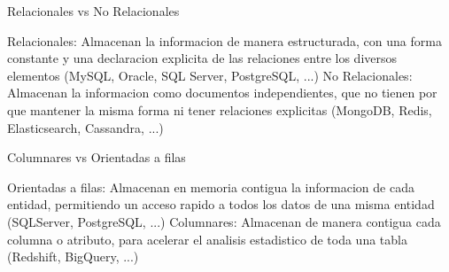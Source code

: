 
Relacionales vs No Relacionales


Relacionales: Almacenan la informacion de manera estructurada, con una forma constante y una declaracion explicita de las relaciones entre los diversos elementos (MySQL, Oracle, SQL Server, PostgreSQL, ...)
No Relacionales: Almacenan la informacion como documentos independientes, que no tienen por que mantener la misma forma ni tener relaciones explicitas (MongoDB, Redis, Elasticsearch, Cassandra, ...)


Columnares vs Orientadas a filas

Orientadas a filas: Almacenan en memoria contigua la informacion de cada entidad, permitiendo un acceso rapido a todos los datos de una misma entidad (SQLServer, PostgreSQL, ...)
Columnares: Almacenan de manera contigua cada columna o atributo, para acelerar el analisis estadistico de toda una tabla (Redshift, BigQuery, ...)  
